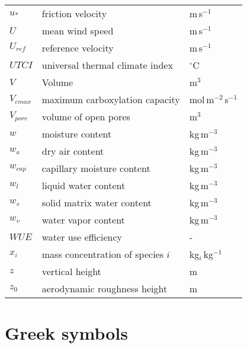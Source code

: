 \begin{longtable}{p{}p{}p{}}
	$u_*$ & friction velocity & m\,s$^{-1}$ \\ 
	$U$ & mean wind speed & m\,s$^{-1}$ \\ 
	$U_{\textit{ref}}$ & reference velocity & m\,s$^{-1}$ \\ 	
	$\textit{UTCI}$ & universal thermal climate index & $^{\circ}$C \\ 	

	$V$ & Volume & m$^{3}$ \\ 
	$V_{\textit{cmax}}$ & maximum carboxylation capacity & mol\,m$^{-2}$\,s$^{-1}$ \\ 
	$V_{\textit{pore}}$ & volume of open pores & m$^{3}$ \\ 
	$w$ & moisture content & kg\,m$^{-3}$ \\ 
	$w_a$ & dry air content & kg\,m$^{-3}$ \\ 	

	$w_{\textit{cap}}$ & capillary moisture content & kg\,m$^{-3}$ \\ 
	$w_l$ & liquid water content & kg\,m$^{-3}$ \\ 		
	$w_s$ & solid matrix water content & kg\,m$^{-3}$ \\ 
	$w_v$ & water vapor content & kg\,m$^{-3}$ \\ 		
	$\textit{WUE}$ & water use efficiency & - \\ 			
	$x_i$ & mass concentration of species $i$ & kg$_i$\,kg$^{-1}$ \\ 	
	$z$ & vertical height & m \\ 	
	$z_0$ & aerodynamic roughness height & m \\ 		
\end{longtable}
\vfill
\bigskip
\section*{Greek symbols}


